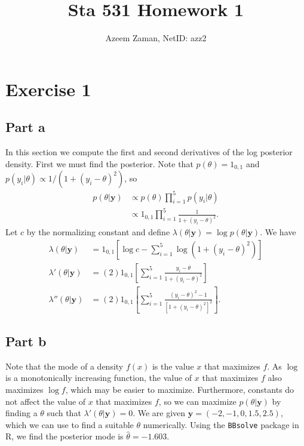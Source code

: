 \documentclass[a4paper,10pt]{article}
\title{Sta 531 Homework 1}
\author{Azeem Zaman, NetID: azz2}
\newcommand{\by}{\mathbf{y}}
\begin{document}
\maketitle


\section{Exercise 1}
\subsection{Part a}
In this section we compute the first and second derivatives of the log posterior density.  First we must find the posterior.  Note that $p(\theta) = 1_{0,1}$ and $p(y_i|\theta) \propto 1/(1+(y_i-\theta)^2)$, so
\begin{align*}
 p(\theta|\by) &\propto p(\theta)\prod_{i=1}^5{p(y_i|\theta)} \\
 &\propto 1_{0,1}\prod_{i=1}^5{\frac{1}{1+(y_i-\theta)^2}}.
\end{align*}
Let $c$ by the normalizing constant and define $\lambda(\theta|\by)=\log{p(\theta|\by)}$. We have
\begin{align*}
 \lambda(\theta|\by) &= 1_{0,1}\left[\log{c}-\sum_{i=1}^5{\log(1 + (y_i - \theta)^2)}\right] \\
 \lambda'(\theta|\by) &= (2)1_{0,1}\left[\sum_{i=1}^5\frac{y_i - \theta}{1 + (y_i - \theta)^2}\right] \\
 \lambda''(\theta|\by) &= (2)1_{0,1}\left[\sum_{i=1}^5\frac{(y_i-\theta)^2-1}{\left[1+(y_i-\theta)^2\right]^2}\right].
\end{align*}
\subsection{Part b}
Note that the mode of a density $f(x)$ is the value $x$ that maximizes $f$.  As $\log$ is a monotonically increasing function, the value of $x$ that maximizes $f$ also maximizes $\log{f}$, which may be easier to maximize.  Furthermore, constants do not affect the value of $x$ that maximizes $f$, so we can maximize $p(\theta|\by)$ by finding a $\theta$ such that $\lambda'(\theta|\by) = 0$.  We are given $\by = (-2,-1,0,1.5,2.5)$, which we can use to find a suitable $\theta$ numerically.  Using the \texttt{BBsolve} package in R, we find the posterior mode is $\hat{\theta} = -1.603$.  
\end{document}
